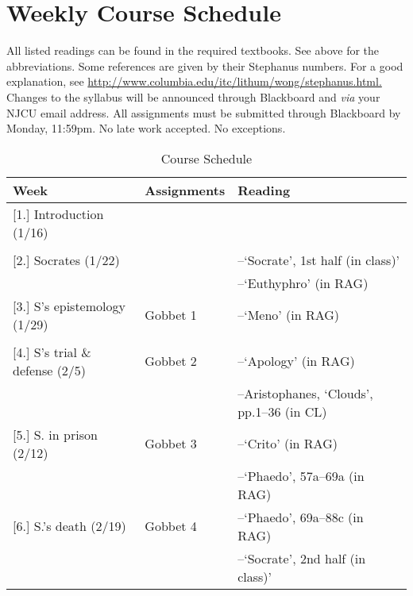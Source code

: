 \documentclass[article,oneside]{memoir}
\begin{document}
\section{Weekly Course Schedule}
All listed readings can be found in the required textbooks. See above for the abbreviations. Some references are given by their Stephanus numbers. For a good explanation, see \href{http://www.columbia.edu/itc/lithum/wong/stephanus.html}{http://www.columbia.edu/itc/lithum/wong/stephanus.html.
} 
 Changes to the syllabus will be announced through Blackboard and \emph{via} your NJCU email address.  All assignments must be submitted through Blackboard by Monday, 11:59pm. No late work accepted. No exceptions.   \newline

\begin{center}
\begin{longtable}{p{4.5cm}p{2cm}p{6cm}}
 
  \caption{Course Schedule} \\
  \toprule
  \textbf{Week} &\textbf{Assignments} & \textbf{Reading} \\
  \midrule

  

[1.] Introduction	(1/16)	  			& 	 			&   \\
								&		  		&    \\ [1.8\baselineskip]

[2.] Socrates (1/22)					& 				& --`Socrate', 1st half (in class)' \\
			        					&			  	& --`Euthyphro'  (in RAG) \\  [1.8\baselineskip]
	
[3.] S's epistemology  (1/29)				& Gobbet 1		&  --`Meno' (in RAG) \\
			       					&		  		&   \\[1.8\baselineskip]


[4.] S's trial \& defense (2/5)				& Gobbet 2		& --`Apology' (in RAG) \\
			     				   	& 			    	& --Aristophanes, `Clouds', pp.1--36 (in CL) \\ [1.8\baselineskip]

[5.] S. in prison (2/12)	& Gobbet 3		 & --`Crito' (in RAG)\\
								& 			    	&  --`Phaedo', 57a--69a (in RAG)\\ [1.8\baselineskip]



[6.] S.'s death (2/19)	   	& Gobbet 4		 & --`Phaedo', 69a--88c  (in RAG)   \\
			        					& 				 & --`Socrate', 2nd half (in class)' \\ [1.8\baselineskip]
  

\end{longtable}
\end{center}
\end{document}
